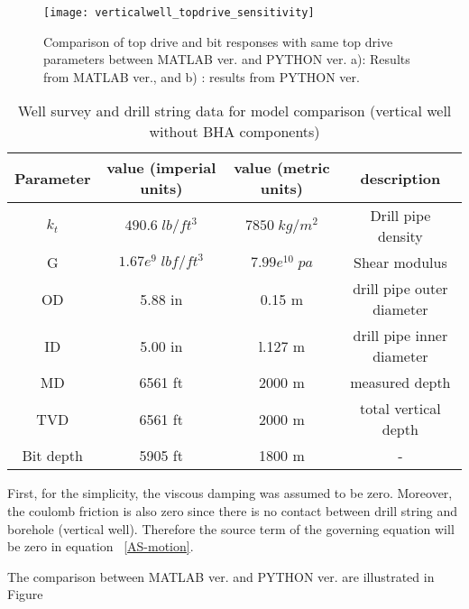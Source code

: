 \begin{figure}[!hbt]
  \centering
  \texttt{[image: verticalwell\_topdrive\_sensitivity]}
  \caption[Comparison of drillstring response to same top drive parameters]{Comparison of top drive and bit responses with same top drive parameters between MATLAB ver. and PYTHON ver. a): Results from MATLAB ver., and b) : results from PYTHON ver.}\label{figure_topdrive_sensitivity}
\end{figure}

\begin{table}[!hbt]
\centering
\begin{tabular}{|c|c|c|c|}
\hline
Parameter & value (imperial units) & value (metric units) & description\\                                                              
\hline
$k_t$ & $490.6\;lb/ft^3$ & $7850\;kg/m^2$ & Drill pipe density \\                                                  
\hline
G & $1.67e^9\;lbf/ft^3$ & $7.99e^{10}\;pa$  & Shear modulus \\                                                  
\hline
OD & 5.88 in & 0.15 m & drill pipe outer diameter\\                                                       
\hline
ID & 5.00 in & l.127 m & drill pipe inner diameter  \\                                                      
\hline
MD & 6561 ft & 2000 m & measured depth\\                                                              
\hline
TVD & 6561 ft & 2000 m & total vertical depth\\
\hline
Bit depth & 5905 ft & 1800 m & - \\ 
\hline
\end{tabular}
\caption[Well survey data for model comparison (vertical well)]{Well survey and drill string data for model comparison (vertical well without BHA components)}\label{table_topdrivesensitivity_input}
\end{table}


First, for the simplicity, the viscous damping was assumed to be zero. Moreover, the coulomb friction is also zero since there is no contact between drill string and borehole (vertical well). Therefore the source term of the governing equation will be zero in equation \equationname~\ref{AS-motion}.

The comparison between MATLAB ver. and PYTHON ver. are illustrated in Figure



